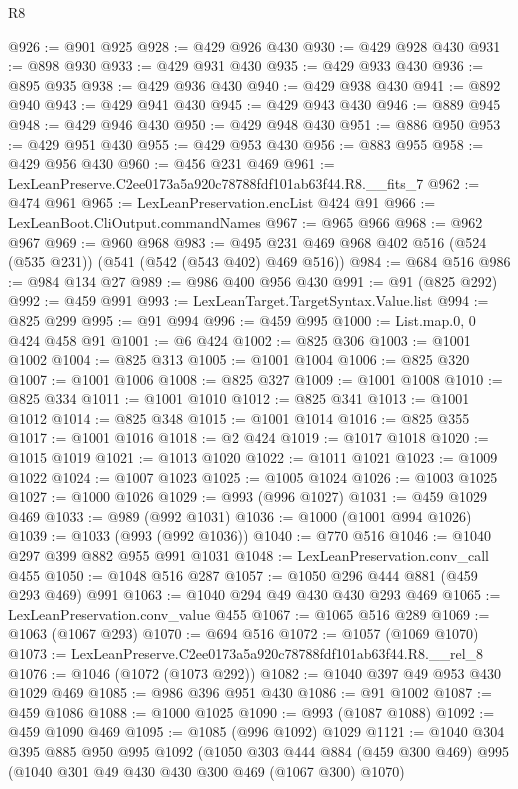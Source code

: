 \begin{lexlean}{R8}
\begin{coremodule}
@926 := @901 @925
@928 := @429 @926 @430
@930 := @429 @928 @430
@931 := @898 @930
@933 := @429 @931 @430
@935 := @429 @933 @430
@936 := @895 @935
@938 := @429 @936 @430
@940 := @429 @938 @430
@941 := @892 @940
@943 := @429 @941 @430
@945 := @429 @943 @430
@946 := @889 @945
@948 := @429 @946 @430
@950 := @429 @948 @430
@951 := @886 @950
@953 := @429 @951 @430
@955 := @429 @953 @430
@956 := @883 @955
@958 := @429 @956 @430
@960 := @456 @231 @469
@961 := LexLeanPreserve.C2ee0173a5a920c78788fdf101ab63f44.R8.__fits_7
@962 := @474 @961
@965 := LexLeanPreservation.encList @424 @91
@966 := LexLeanBoot.CliOutput.commandNames
@967 := @965 @966
@968 := @962 @967
@969 := @960 @968
@983 := @495 @231 @469 @968 @402 @516 (@524 (@535 @231)) (@541 (@542 (@543 @402) @469 @516))
@984 := @684 @516
@986 := @984 @134 @27
@989 := @986 @400 @956 @430
@991 := @91 (@825 @292)
@992 := @459 @991
@993 := LexLeanTarget.TargetSyntax.Value.list
@994 := @825 @299
@995 := @91 @994
@996 := @459 @995
@1000 := List.map.{0, 0} @424 @458 @91
@1001 := @6 @424
@1002 := @825 @306
@1003 := @1001 @1002
@1004 := @825 @313
@1005 := @1001 @1004
@1006 := @825 @320
@1007 := @1001 @1006
@1008 := @825 @327
@1009 := @1001 @1008
@1010 := @825 @334
@1011 := @1001 @1010
@1012 := @825 @341
@1013 := @1001 @1012
@1014 := @825 @348
@1015 := @1001 @1014
@1016 := @825 @355
@1017 := @1001 @1016
@1018 := @2 @424
@1019 := @1017 @1018
@1020 := @1015 @1019
@1021 := @1013 @1020
@1022 := @1011 @1021
@1023 := @1009 @1022
@1024 := @1007 @1023
@1025 := @1005 @1024
@1026 := @1003 @1025
@1027 := @1000 @1026
@1029 := @993 (@996 @1027)
@1031 := @459 @1029 @469
@1033 := @989 (@992 @1031)
@1036 := @1000 (@1001 @994 @1026)
@1039 := @1033 (@993 (@992 @1036))
@1040 := @770 @516
@1046 := @1040 @297 @399 @882 @955 @991 @1031
@1048 := LexLeanPreservation.conv_call @455
@1050 := @1048 @516 @287
@1057 := @1050 @296 @444 @881 (@459 @293 @469) @991
@1063 := @1040 @294 @49 @430 @430 @293 @469
@1065 := LexLeanPreservation.conv_value @455
@1067 := @1065 @516 @289
@1069 := @1063 (@1067 @293)
@1070 := @694 @516
@1072 := @1057 (@1069 @1070)
@1073 := LexLeanPreserve.C2ee0173a5a920c78788fdf101ab63f44.R8.__rel_8
@1076 := @1046 (@1072 (@1073 @292))
@1082 := @1040 @397 @49 @953 @430 @1029 @469
@1085 := @986 @396 @951 @430
@1086 := @91 @1002
@1087 := @459 @1086
@1088 := @1000 @1025
@1090 := @993 (@1087 @1088)
@1092 := @459 @1090 @469
@1095 := @1085 (@996 @1092) @1029
@1121 := @1040
    @304
    @395
    @885
    @950
    @995
    @1092
    (@1050
      @303
      @444
      @884
      (@459 @300 @469)
      @995
      (@1040 @301 @49 @430 @430 @300 @469 (@1067 @300) @1070)

\end{coremodule}
\end{lexlean}
